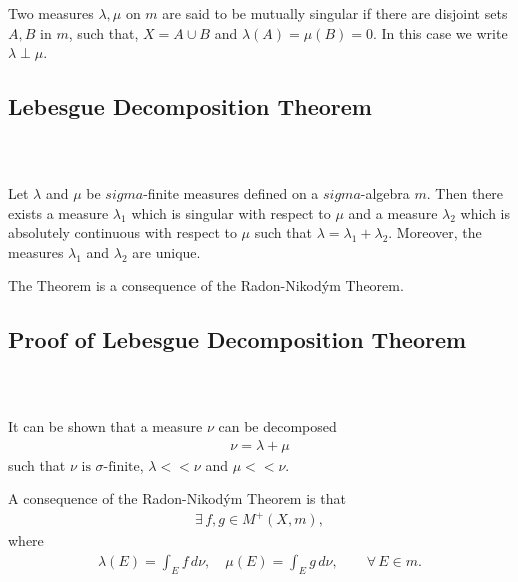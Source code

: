 \documentclass{beamer}
\numberwithin{equation}{section}
\begin{document}
\begin{frame}\frametitle{{\normalsize \secname} \\ {\large \subsecname}}
    \begin{definition}
        Two measures $\lambda, \mu$ on $m$ are said to be mutually singular if there are disjoint sets $A, B$ in $m$, such that, $X = A \cup B$ and $\lambda (A) = \mu (B) = 0$.
        In this case we write $\lambda \perp \mu$.
    \end{definition}
\end{frame}

\subsection{Lebesgue Decomposition Theorem}

\begin{frame}\frametitle{{\normalsize \secname} \\ {\large \subsecname}}
    \begin{theorem}
        Let $\lambda$ and $\mu$ be $sigma$-finite measures defined on a $sigma$-algebra $m$.
        Then there exists a measure $\lambda_1$ which is singular with respect to $\mu$ and a measure $\lambda_2$ which is absolutely continuous with respect to $\mu$ such that $\lambda = \lambda_1 + \lambda_2$.
        Moreover, the measures $\lambda_1$ and $\lambda_2$ are unique.
    \end{theorem}
    \vspace{1em}

    The Theorem is a consequence of the Radon-Nikodým Theorem.
\end{frame}

\subsection{Proof of Lebesgue Decomposition Theorem}

\begin{frame}\frametitle{{\normalsize \secname} \\ {\large \subsecname}}
    It can be shown that a measure $\nu$ can be decomposed
    \begin{align}
        \nu = \lambda + \mu
    \end{align}
    such that $\nu \text{ is } \sigma\text{-finite}$, $\lambda << \nu$ and $\mu << \nu$.
    \vspace{1em}

    A consequence of the Radon-Nikodým Theorem is that
    \begin{align}
        \exists \, f,g \in M^+(X, m),
    \end{align}
    where
    \begin{align}
        \lambda(E) = \int_E f \, d\nu, \quad \mu(E) = \int_E g \, d\nu, \qquad \forall \, E \in m.
    \end{align}
\end{frame}
\end{document}
